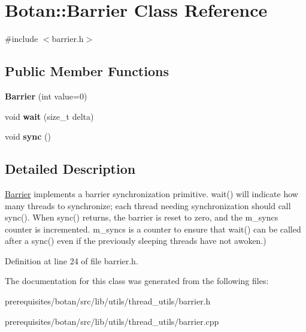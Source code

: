 \hypertarget{class_botan_1_1_barrier}{}\section{Botan\+:\+:Barrier Class Reference}
\label{class_botan_1_1_barrier}


{\ttfamily \#include $<$barrier.\+h$>$}

\subsection*{Public Member Functions}
\begin{DoxyCompactItemize}
\item 
\mbox{\label{class_botan_1_1_barrier_a24ed12d2fa634730f6c55eb4d814cd92}} 
{\bfseries Barrier} (int value=0)
\item 
\mbox{\label{class_botan_1_1_barrier_a21c4f0e88559af1e733d57fcd77e7648}} 
void {\bfseries wait} (size\+\_\+t delta)
\item 
\mbox{\label{class_botan_1_1_barrier_ae6cc7d541cd03359f40a45abff6b5b02}} 
void {\bfseries sync} ()
\end{DoxyCompactItemize}


\subsection{Detailed Description}
\mbox{\hyperlink{class_botan_1_1_barrier}{Barrier}} implements a barrier synchronization primitive. wait() will indicate how many threads to synchronize; each thread needing synchronization should call sync(). When sync() returns, the barrier is reset to zero, and the m\+\_\+syncs counter is incremented. m\+\_\+syncs is a counter to ensure that wait() can be called after a sync() even if the previously sleeping threads have not awoken.) 

Definition at line 24 of file barrier.\+h.



The documentation for this class was generated from the following files\+:\begin{DoxyCompactItemize}
\item 
prerequisites/botan/src/lib/utils/thread\+\_\+utils/barrier.\+h\item 
prerequisites/botan/src/lib/utils/thread\+\_\+utils/barrier.\+cpp\end{DoxyCompactItemize}
